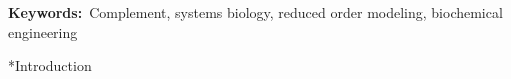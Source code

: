 \documentclass[12pt]{article}
\makeatletter
\renewcommand\section{\@startsection
	{subsection}{2}{0mm}
	{-0.2in}
	{0.05\baselineskip}
	{\normalfont\large\bfseries}}
\makeatother
\begin{document}
\vspace{0.1in}
{\noindent \textbf{Keywords:}~Complement, systems biology, reduced order modeling, biochemical engineering}

\pagebreak

\setcounter{page}{1}

\linenumbers


\section*{Introduction}



\end{document}
